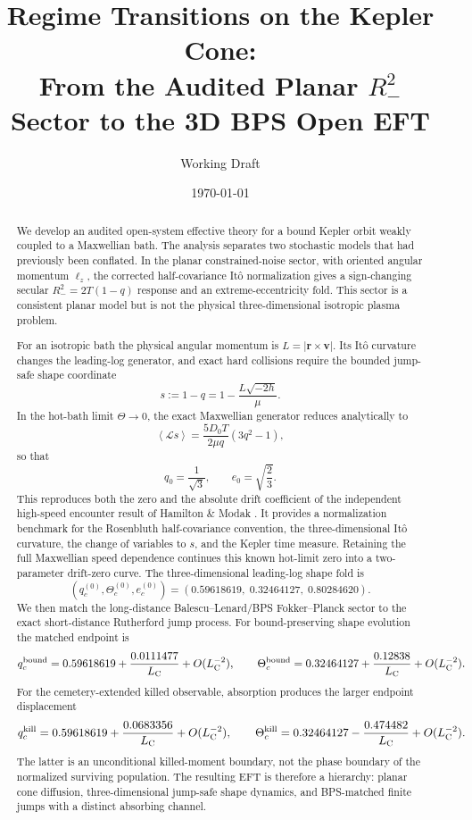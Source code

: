 \documentclass[11pt]{article}
\title{Regime Transitions on the Kepler Cone:\\
From the Audited Planar $R_-^2$ Sector to the 3D BPS Open EFT}
\author{Working Draft}
\date{\today}
\theoremstyle{remark}
\newcommand{\1}{\mathbf 1}
\begin{document}
\maketitle

\begin{abstract}
We develop an audited open-system effective theory for a bound Kepler orbit
weakly coupled to a Maxwellian bath.  The analysis separates two stochastic
models that had previously been conflated.  In the planar constrained-noise
sector, with oriented angular momentum $\ell_z$, the corrected
half-covariance It\^o normalization gives a sign-changing secular
$R_-^2=2T(1-q)$ response and an extreme-eccentricity fold.  This sector is a
consistent planar model but is not the physical three-dimensional isotropic
plasma problem.

For an isotropic bath the physical angular momentum is
$L=|\bm r\times\bm v|$.  Its It\^o curvature changes the leading-log
generator, and exact hard collisions require the bounded jump-safe shape
coordinate
\[
s:=1-q=1-\frac{L\sqrt{-2h}}{\mu}.
\]
In the hot-bath limit $\Theta\to0$, the exact Maxwellian generator reduces
analytically to
\[
\left\langle\mathcal Ls\right\rangle
=
\frac{5D_0T}{2\mu q}(3q^2-1),
\]
so that
\[
q_0=\frac1{\sqrt3},
\qquad
e_0=\sqrt{\frac23}.
\]
This reproduces both the zero and the absolute drift coefficient of the
independent high-speed encounter result of Hamilton \& Modak
\cite{HamiltonModak2024}.  It provides a normalization benchmark for the
Rosenbluth half-covariance convention, the three-dimensional It\^o curvature,
the change of variables to $s$, and the Kepler time measure.  Retaining the
full Maxwellian speed dependence continues this known hot-limit zero into a
two-parameter drift-zero curve.  The three-dimensional leading-log shape fold is
\[
(q_c^{(0)},\Theta_c^{(0)},e_c^{(0)})
=
(0.59618619,\;0.32464127,\;0.80284620).
\]
We then match the long-distance Balescu--Lenard/BPS Fokker--Planck sector to
the exact short-distance Rutherford jump process.  For bound-preserving shape
evolution the matched endpoint is
\[
q_c^{\rm bound}
=
0.59618619+\frac{0.0111477}{L_{\rm C}}+O(L_{\rm C}^{-2}),
\qquad
\Theta_c^{\rm bound}
=
0.32464127+\frac{0.12838}{L_{\rm C}}+O(L_{\rm C}^{-2}).
\]
For the cemetery-extended killed observable, absorption produces the larger
endpoint displacement
\[
q_c^{\rm kill}
=
0.59618619+\frac{0.0683356}{L_{\rm C}}+O(L_{\rm C}^{-2}),
\qquad
\Theta_c^{\rm kill}
=
0.32464127-\frac{0.474482}{L_{\rm C}}+O(L_{\rm C}^{-2}).
\]
The latter is an unconditional killed-moment boundary, not the phase boundary
of the normalized surviving population.  The resulting EFT is therefore a
hierarchy: planar cone diffusion, three-dimensional jump-safe shape dynamics,
and BPS-matched finite jumps with a distinct absorbing channel.
\end{abstract}
\end{document}
